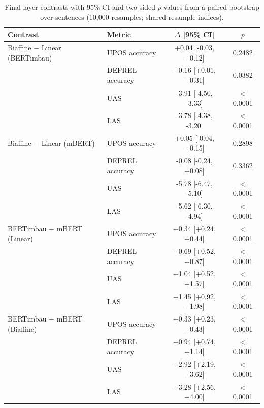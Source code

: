 \begin{table}[t]
\centering
\caption{Final-layer contrasts with 95\% CI and two-sided $p$-values from a paired bootstrap over sentences (10,000 resamples; shared resample indices).}
\label{tab:significance}
\begin{tabular}{llcc}
\toprule
Contrast & Metric & $\Delta$ [95\% CI] & $p$ \\
\midrule
Biaffine $-$ Linear (BERTimbau) & UPOS accuracy & +0.04 [-0.03, +0.12] & 0.2482 \\
 & DEPREL accuracy & +0.16 [+0.01, +0.31] & 0.0382 \\
 & UAS & -3.91 [-4.50, -3.33] & $<$0.0001 \\
 & LAS & -3.78 [-4.38, -3.20] & $<$0.0001 \\
\midrule
Biaffine $-$ Linear (mBERT) & UPOS accuracy & +0.05 [-0.04, +0.15] & 0.2898 \\
 & DEPREL accuracy & -0.08 [-0.24, +0.08] & 0.3362 \\
 & UAS & -5.78 [-6.47, -5.10] & $<$0.0001 \\
 & LAS & -5.62 [-6.30, -4.94] & $<$0.0001 \\
\midrule
BERTimbau $-$ mBERT (Linear) & UPOS accuracy & +0.34 [+0.24, +0.44] & $<$0.0001 \\
 & DEPREL accuracy & +0.69 [+0.52, +0.87] & $<$0.0001 \\
 & UAS & +1.04 [+0.52, +1.57] & $<$0.0001 \\
 & LAS & +1.45 [+0.92, +1.98] & $<$0.0001 \\
\midrule
BERTimbau $-$ mBERT (Biaffine) & UPOS accuracy & +0.33 [+0.23, +0.43] & $<$0.0001 \\
 & DEPREL accuracy & +0.94 [+0.74, +1.14] & $<$0.0001 \\
 & UAS & +2.92 [+2.19, +3.62] & $<$0.0001 \\
 & LAS & +3.28 [+2.56, +4.00] & $<$0.0001 \\
\bottomrule
\end{tabular}
\end{table}

